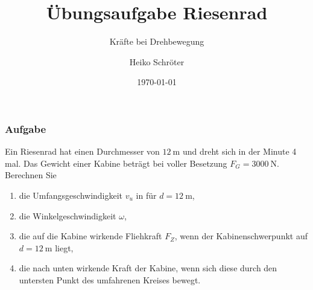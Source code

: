 \documentclass{beamer}
\title{Übungsaufgabe Riesenrad}
\subtitle{Kräfte bei Drehbewegung}
\author{Heiko Schröter}
\date{\today}
\begin{document}
\frame{\titlepage}

\frame
{
  \frametitle{Aufgabe}
Ein Riesenrad hat einen Durchmesser von $\SI{12}{\meter}$ und dreht sich in der Minute 4 mal. Das Gewicht einer Kabine beträgt bei voller Besetzung $F_G=\SI{3000}{\newton}$. Berechnen Sie
\begin{enumerate}
\item die Umfangsgeschwindigkeit $v_u$ in \si{\frac{\meter}{\second}} für $d=\SI{12}{\meter}$,
\item die Winkelgeschwindigkeit $\omega$,
\item die auf die Kabine wirkende Fliehkraft $F_Z$, wenn der Kabinenschwerpunkt auf $d=\SI{12}{\meter}$ liegt,
\item die nach unten wirkende Kraft der Kabine, wenn sich diese durch den untersten Punkt des umfahrenen Kreises bewegt.
\end{enumerate}
}

\end{document}
